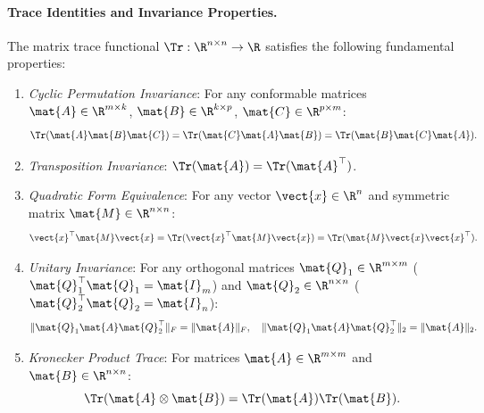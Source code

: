\paragraph{Trace Identities and Invariance Properties.}
The matrix trace functional $\Tr: \R^{n \times n} \to \R$ satisfies the following fundamental properties:
\begin{enumerate}
    \item \emph{Cyclic Permutation Invariance}: For any conformable matrices $\mat{A} \in \R^{m \times k}$, $\mat{B} \in \R^{k \times p}$, $\mat{C} \in \R^{p \times m}$:
    \begin{equation}
    \Tr(\mat{A} \mat{B} \mat{C}) = \Tr(\mat{C} \mat{A} \mat{B}) = \Tr(\mat{B} \mat{C} \mat{A}).
    \label{eq:cyclic_trace}
    \end{equation}
    \item \emph{Transposition Invariance}: $\Tr(\mat{A}) = \Tr(\mat{A}^\top)$.
    \item \emph{Quadratic Form Equivalence}: For any vector $\vect{x} \in \R^n$ and symmetric matrix $\mat{M} \in \R^{n \times n}$:
    \begin{equation}
    \vect{x}^\top \mat{M} \vect{x} = \Tr(\vect{x}^\top \mat{M} \vect{x}) = \Tr(\mat{M} \vect{x} \vect{x}^\top).
    \label{eq:quadratic_form_trace}
    \end{equation}
    \item \emph{Unitary Invariance}: For any orthogonal matrices $\mat{Q}_1 \in \R^{m \times m}$ ($\mat{Q}_1^\top \mat{Q}_1 = \mat{I}_m$) and $\mat{Q}_2 \in \R^{n \times n}$ ($\mat{Q}_2^\top \mat{Q}_2 = \mat{I}_n$):
    \begin{equation}
    \|\mat{Q}_1 \mat{A} \mat{Q}_2^\top\|_F = \|\mat{A}\|_F, \quad \|\mat{Q}_1 \mat{A} \mat{Q}_2^\top\|_2 = \|\mat{A}\|_2.
    \label{eq:unitary_invariance_norm}
    \end{equation}
    \item \emph{Kronecker Product Trace}: For matrices $\mat{A} \in \R^{m \times m}$ and $\mat{B} \in \R^{n \times n}$:
    \begin{equation}
    \Tr(\mat{A} \otimes \mat{B}) = \Tr(\mat{A}) \Tr(\mat{B}).
    \label{eq:kronecker_trace}
    \end{equation}
\end{enumerate}

